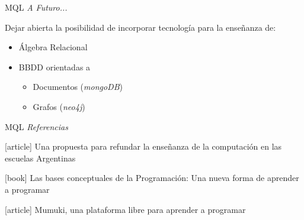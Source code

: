 \documentclass{beamer}
\begin{document}
\begin{frame}
    {MQL}
    {\emph{A Futuro...}}

    Dejar abierta la posibilidad de incorporar tecnología para la enseñanza de:

    \begin{itemize}
        \item Álgebra Relacional

        \item BBDD orientadas a

        \begin{itemize}
            \item Documentos {\footnotesize (\emph{mongoDB})}
            \item Grafos {\footnotesize (\emph{neo4j})}
        \end{itemize}

    \end{itemize}

\end{frame}





\begin{frame}
    {MQL}
    {\emph{Referencias}}

    \begin{thebibliography}{10}
      [article]
        Una propuesta para refundar la enseñanza de la computación en las escuelas Argentinas

      [book]
        Las bases conceptuales de la Programación: Una nueva forma de aprender a programar

      [article]
        Mumuki, una plataforma libre para aprender a programar
      \end{thebibliography}
\end{frame}
\end{document}

